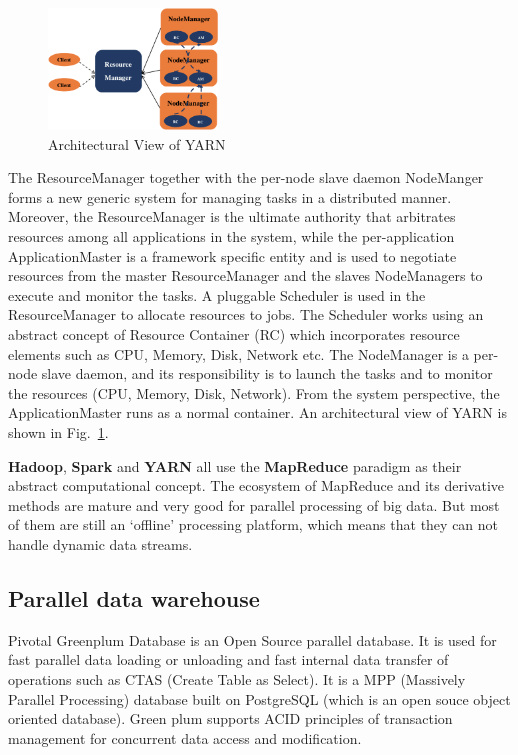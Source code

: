 \documentclass[	DIV=calc,%
							paper=a4,%
							fontsize=11pt,%
							twocolumn]{scrartcl}	 					%
\begin{document}
\begin{figure}
  \centering
    \includegraphics[width=0.4\textwidth]{images/YARN.png}
    \caption{Architectural View of YARN}
    \label{fig:YARN}   
\end{figure}

The ResourceManager together with the per-node slave daemon NodeManger forms a new generic system for managing tasks in a distributed manner. Moreover, the ResourceManager is the ultimate authority that arbitrates resources among all applications in the system, while the per-application ApplicationMaster is a framework specific entity and is used to negotiate resources from the master ResourceManager and the slaves NodeManagers to execute and monitor the tasks. A pluggable Scheduler is used in the ResourceManager to allocate resources to jobs. The Scheduler works using an abstract concept of Resource Container (RC) which incorporates resource elements such as CPU, Memory, Disk, Network etc. The NodeManager is a per-node slave daemon, and its responsibility is to launch the tasks and to monitor the resources (CPU, Memory, Disk, Network). From the system perspective, the ApplicationMaster runs as a normal container.
An architectural view of YARN is shown in Fig.~\ref{fig:YARN}.

\textbf{Hadoop}, \textbf{Spark} and \textbf{YARN} all use the \textbf{MapReduce} paradigm as their abstract computational concept. The ecosystem of MapReduce and its derivative methods are mature and very good for parallel processing of big data. But most of them are still an `offline' processing platform, which means that they can not handle dynamic data streams.



\subsection*{Parallel data warehouse}
Pivotal Greenplum Database is an Open Source parallel database. It is used for fast parallel data loading or unloading and fast internal data transfer of operations such as CTAS (Create Table as Select). It is a MPP (Massively Parallel Processing) database built on PostgreSQL (which is an open souce object oriented database). Green plum supports ACID principles of transaction management for concurrent data access and modification. 
\end{document}

